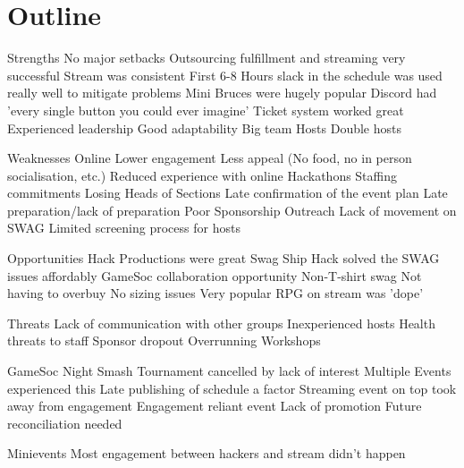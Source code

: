 \documentclass[11pt,hacksoc]{meetingmins}
\begin{document}
\maketitle

\section{Outline}
\begin{items}
\item Strengths
  \subitem No major setbacks
  \subitem Outsourcing fulfillment and streaming very successful
  \subitem Stream was consistent
  \subitem First 6-8 Hours slack in the schedule was used really well to mitigate problems
  \subitem Mini Bruces were hugely popular
  \subitem Discord had 'every single button you could ever imagine'
    \subsubitem Ticket system worked great
  \subitem Experienced leadership
  \subitem Good adaptability
  \subitem Big team
  \subitem Hosts
    \subsubitem Double hosts
\item Weaknesses
  \subitem Online 
    \subsubitem Lower engagement 
    \subsubitem Less appeal (No food, no in person socialisation, etc.)
  \subitem Reduced experience with online Hackathons
  \subitem Staffing commitments
    \subsubitem Losing Heads of Sections
  \subitem Late confirmation of the event plan
  \subitem Late preparation/lack of preparation
  \subitem Poor Sponsorship Outreach
  \subitem Lack of movement on SWAG
  \subitem Limited screening process for hosts
\item Opportunities
  \subitem Hack Productions were great
  \subitem Swag Ship Hack solved the SWAG issues affordably
  \subitem GameSoc collaboration opportunity 
  \subitem Non-T-shirt swag
    \subsubitem Not having to overbuy
    \subsubitem No sizing issues
    \subsubitem Very popular
  \subitem RPG on stream was 'dope'
\item Threats
  \subitem Lack of communication with other groups
  \subitem Inexperienced hosts
  \subitem Health threats to staff
  \subitem Sponsor dropout
  \subitem Overrunning Workshops
\item GameSoc Night
  \subitem Smash Tournament cancelled by lack of interest
    \subsubitem Multiple Events experienced this
    \subsubitem Late publishing of schedule a factor
  \subitem Streaming event on top took away from engagement
  \subitem Engagement reliant event
  \subitem Lack of promotion
  \subitem Future reconciliation needed
\item Minievents
  \subitem Most engagement between hackers and stream didn't happen

\end{items}
\end{document}
